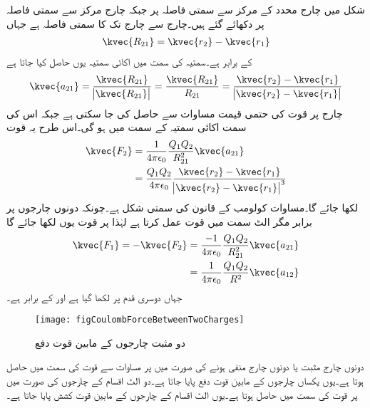 شکل  میں چارج  محدد کے مرکز سے سمتی فاصلہ  پر جبکہ چارج  مرکز سے سمتی فاصلہ  پر دکھائے گئے ہیں۔چارج  سے چارج  تک کا سمتی فاصلہ  ہے جہاں
\begin{align}
\kvec{R_{21}}=\kvec{r_2}-\kvec{r_1}
\end{align}
کے برابر ہے۔سمتیہ  کی سمت میں اکائی سمتیہ  یوں حاصل کیا جاتا ہے
\begin{align}
\kvec{a_{21}}=\frac{\kvec{R_{21}}}{\abs{\kvec{R_{21}}}}=\frac{\kvec{R_{21}}}{R_{21}}=\frac{\kvec{r_2}-\kvec{r_1}}{\abs{\kvec{r_2}-\kvec{r_1}}}
\end{align}
چارج  پر قوت  کی حتمی قیمت مساوات   سے حاصل کی جا سکتی ہے جبکہ اس کی سمت اکائی سمتیہ  کے سمت میں ہو گی۔اس طرح یہ قوت
\begin{gather}
\begin{aligned}\label{مساوات_کولومب_قوت_کی_مساوات_الف}
\kvec{F_2}&=\frac{1}{4 \pi \epsilon_0}\frac{Q_1 Q_2}{ R_{21}^2} {\kvec{a_{21}}}\\
&=\frac{Q_1 Q_2}{4 \pi \epsilon_0}\frac{\kvec{r_2}-\kvec{r_1}}{\abs{\kvec{r_2}-\kvec{r_1}}^3}
\end{aligned}
\end{gather}
لکھا جائے گا۔مساوات  کولومب کے قانون کی سمتی شکل ہے۔چونکہ دونوں چارجوں پر برابر مگر الٹ سمت میں قوت عمل کرتا ہے لہٰذا  پر قوت  یوں لکھا جائے گا
 \begin{gather}
\begin{aligned}
\kvec{F_1}=-\kvec{F_2}&=\frac{-1}{4 \pi \epsilon_0}\frac{Q_1 Q_2}{ R_{21}^2} \kvec{a_{21}}\\
&=\frac{1}{4 \pi \epsilon_0}\frac{Q_1 Q_2}{ R^2} {\kvec{a_{12}}}
\end{aligned}
\end{gather}
جہاں دوسری قدم پر  لکھا گیا ہے اور  کے برابر ہے۔
%
\begin{figure}
\centering
\texttt{[image: figCoulombForceBetweenTwoCharges]}
\caption{دو مثبت چارجوں کے مابین قوت دفع}
\label{شکل_سمتیہ_دو_مثبت_چارج_قوت_دفع}
\end{figure}
دونوں چارج مثبت یا دونوں چارج منفی ہونے کی صورت میں  پر مساوات  سے قوت  کی سمت میں حاصل ہوتا ہے۔یوں یکساں چارجوں کے مابین قوت دفع پایا جاتا ہے۔دو الٹ اقسام کے چارجوں کی صورت میں  پر قوت  کی سمت میں حاصل ہوتا ہے۔یوں الٹ اقسام کے چارجوں کے مابین قوت کشش پایا جاتا ہے۔  

